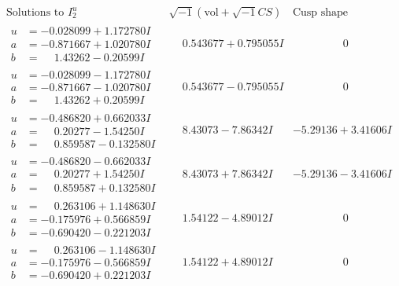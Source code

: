 \documentclass[1p]{elsarticle_modified}
\theoremstyle{definition}
\newcommand{\I}{\sqrt{-1}}
\begin{document}
$$\begin{array}{c|c|c}  
\text{Solutions to }I^u_{2}& \I (\text{vol} + \sqrt{-1}CS) & \text{Cusp shape}\\
 \hline 
\begin{aligned}
u &= -0.028099 + 1.172780 I \\
a &= -0.871667 + 1.020780 I \\
b &= \phantom{-}1.43262 - 0.20599 I\end{aligned}
 & \phantom{-}0.543677 + 0.795055 I & \phantom{-0.000000 } 0 \\ \hline\begin{aligned}
u &= -0.028099 - 1.172780 I \\
a &= -0.871667 - 1.020780 I \\
b &= \phantom{-}1.43262 + 0.20599 I\end{aligned}
 & \phantom{-}0.543677 - 0.795055 I & \phantom{-0.000000 } 0 \\ \hline\begin{aligned}
u &= -0.486820 + 0.662033 I \\
a &= \phantom{-}0.20277 - 1.54250 I \\
b &= \phantom{-}0.859587 - 0.132580 I\end{aligned}
 & \phantom{-}8.43073 - 7.86342 I & -5.29136 + 3.41606 I \\ \hline\begin{aligned}
u &= -0.486820 - 0.662033 I \\
a &= \phantom{-}0.20277 + 1.54250 I \\
b &= \phantom{-}0.859587 + 0.132580 I\end{aligned}
 & \phantom{-}8.43073 + 7.86342 I & -5.29136 - 3.41606 I \\ \hline\begin{aligned}
u &= \phantom{-}0.263106 + 1.148630 I \\
a &= -0.175976 + 0.566859 I \\
b &= -0.690420 - 0.221203 I\end{aligned}
 & \phantom{-}1.54122 - 4.89012 I & \phantom{-0.000000 } 0 \\ \hline\begin{aligned}
u &= \phantom{-}0.263106 - 1.148630 I \\
a &= -0.175976 - 0.566859 I \\
b &= -0.690420 + 0.221203 I\end{aligned}
 & \phantom{-}1.54122 + 4.89012 I & \phantom{-0.000000 } 0 \\ \hline\begin{aligned}

\end{aligned}
\end{array}$$
\end{document}
